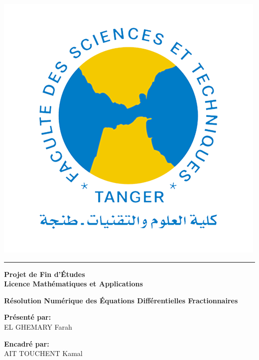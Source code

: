 \begin{titlepage}
\begin{minipage}{.15\textwidth}
\begin{flushright}
        \includegraphics[width=\textwidth]{IMAGES/logo_fstt.png}
    \end{flushright}
\end{minipage}

\begin{center}
\vspace{8mm}
\hrule
\vspace{10mm}
\begin{spacing}{1.8}
{\large\textbf{
Projet de Fin d'Études\\
Licence Mathématiques et Applications
}}
\end{spacing}
\vspace{30mm}

\begin{spacing}{2.0}
{\LARGE \bf Résolution Numérique des Équations Différentielles Fractionnaires}\\
\end{spacing}
\end{center}

\vfill
\noindent

\begin{minipage}[t]{0.5\textwidth}
\large
\textbf{Présenté par:}\\
EL GHEMARY Farah
\end{minipage}
\hfill
\begin{minipage}[t]{0.5\textwidth}
\large
\raggedleft
\textbf{Encadré par:}\\
AIT TOUCHENT Kamal
\end{minipage}
\vspace{2cm}


\end{titlepage}
